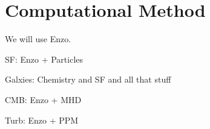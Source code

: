 \section{Computational Method}

We will use Enzo.

SF: Enzo + Particles

Galxies: Chemistry and SF and all that stuff

CMB: Enzo  + MHD 

Turb: Enzo + PPM
